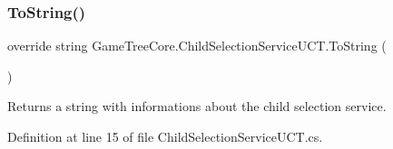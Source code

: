\subsubsection{\texorpdfstring{To\+String()}{ToString()}}
{\footnotesize\ttfamily override string Game\+Tree\+Core.\+Child\+Selection\+Service\+U\+C\+T.\+To\+String (\begin{DoxyParamCaption}{ }\end{DoxyParamCaption})}



Returns a string with informations about the child selection service. 



Definition at line 15 of file Child\+Selection\+Service\+U\+C\+T.\+cs.

